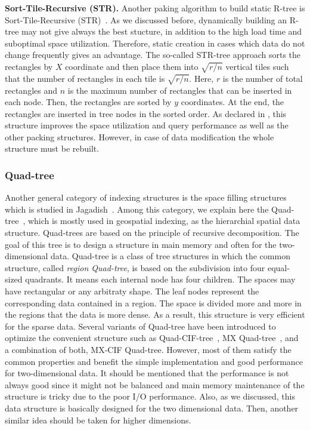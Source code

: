 \documentclass[a4paper,12pt]{article}
\begin{document}
\textbf{Sort-Tile-Recursive (STR).} Another paking algorithm to build static R-tree is Sort-Tile-Recursive (STR)~\cite{strtree}. As we discussed before, dynamically building an R-tree may not give always the best stucture, in addition to the high load time and suboptimal space utilization. Therefore, static creation in cases which data do not change frequently gives an advantage. The so-called STR-tree approach sorts the rectangles by $X$ coordinate and then place them into $\sqrt{r/n}$ vertical tiles such that the number of rectangles in each tile is $\sqrt{r/n}$. Here, $r$ is the number of total rectangles and $n$ is the maximum number of rectangles that can be inserted in each node. Then, the rectangles are sorted by $y$ coordinates. At the end, the rectangles are inserted in tree nodes in the sorted order.
As declared in \cite{strtree}, this structure improves the space utilization and query performance as well as the other packing structures. However, in case of data modification the whole structure must be rebuilt.

\subsubsection{Quad-tree}
\label{quad-tree-based}
Another general category of indexing structures is the space filling structures which is studied in Jagadish~\cite{spacefilling}.
Among this category, we explain here the Quad-tree~\cite{quadtree}, which is mostly used in geospatial indexing, as the hierarchial spatial data structure. Quad-trees are based on the principle of recursive decomposition. The goal of this tree is to design a structure in main memory and often for the two-dimensional data. 
Quad-tree is a class of tree structures in which the common structure, called \textit{region Quad-tree}, is based on the subdivision into four equal-sized quadrants. It means each internal node has four children. The spaces may have rectangular or any arbitraty shape. The leaf nodes represent the corresponding data contained in a region. The space is divided more and more in the regions that the data is more dense. As a result, this structure is very efficient for the sparse data.
Several variants of Quad-tree have been introduced to optimize the convenient structure such as Quad-CIF-tree~\cite{quadcif}, MX Quad-tree~\cite{quadmx}, and a combination of both, MX-CIF Quad-tree. However, most of them satisfy the common properties and benefit the simple implementation and good performance for two-dimensional data.
It should be mentioned that the performance is not always good since it might not be balanced and main memory maintenance of the structure is tricky due to the poor I/O performance.  Also, as we discussed, this data structure is basically designed for the two dimensional data. Then, another similar idea should be taken for higher dimensions.
\end{document}
